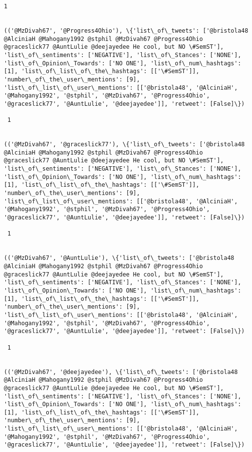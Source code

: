 \documentclass[11pt]{article}
\begin{document}
\begin{Verbatim}[commandchars=\\\{\}]
 1
 

(('@MzDivah67', '@Progress4Ohio'), \{'list\_of\_tweets': ['@bristola48 @AlciniaH @Mahogany1992 @stphil @MzDivah67 @Progress4Ohio @graceslick77 @AuntLulie @deejayedee He cool, but NO \#SemST'], 'list\_of\_sentiments': ['NEGATIVE'], 'list\_of\_Stances': ['NONE'], 'list\_of\_Opinion\_Towards': ['NO ONE'], 'list\_of\_num\_hashtags': [1], 'list\_of\_list\_of\_the\_hashtags': [['\#SemST']], 'number\_of\_the\_user\_mentions': [9], 'list\_of\_list\_of\_user\_mentions': [['@bristola48', '@AlciniaH', '@Mahogany1992', '@stphil', '@MzDivah67', '@Progress4Ohio', '@graceslick77', '@AuntLulie', '@deejayedee']], 'retweet': [False]\})

 1
 

(('@MzDivah67', '@graceslick77'), \{'list\_of\_tweets': ['@bristola48 @AlciniaH @Mahogany1992 @stphil @MzDivah67 @Progress4Ohio @graceslick77 @AuntLulie @deejayedee He cool, but NO \#SemST'], 'list\_of\_sentiments': ['NEGATIVE'], 'list\_of\_Stances': ['NONE'], 'list\_of\_Opinion\_Towards': ['NO ONE'], 'list\_of\_num\_hashtags': [1], 'list\_of\_list\_of\_the\_hashtags': [['\#SemST']], 'number\_of\_the\_user\_mentions': [9], 'list\_of\_list\_of\_user\_mentions': [['@bristola48', '@AlciniaH', '@Mahogany1992', '@stphil', '@MzDivah67', '@Progress4Ohio', '@graceslick77', '@AuntLulie', '@deejayedee']], 'retweet': [False]\})

 1
 

(('@MzDivah67', '@AuntLulie'), \{'list\_of\_tweets': ['@bristola48 @AlciniaH @Mahogany1992 @stphil @MzDivah67 @Progress4Ohio @graceslick77 @AuntLulie @deejayedee He cool, but NO \#SemST'], 'list\_of\_sentiments': ['NEGATIVE'], 'list\_of\_Stances': ['NONE'], 'list\_of\_Opinion\_Towards': ['NO ONE'], 'list\_of\_num\_hashtags': [1], 'list\_of\_list\_of\_the\_hashtags': [['\#SemST']], 'number\_of\_the\_user\_mentions': [9], 'list\_of\_list\_of\_user\_mentions': [['@bristola48', '@AlciniaH', '@Mahogany1992', '@stphil', '@MzDivah67', '@Progress4Ohio', '@graceslick77', '@AuntLulie', '@deejayedee']], 'retweet': [False]\})

 1
 

(('@MzDivah67', '@deejayedee'), \{'list\_of\_tweets': ['@bristola48 @AlciniaH @Mahogany1992 @stphil @MzDivah67 @Progress4Ohio @graceslick77 @AuntLulie @deejayedee He cool, but NO \#SemST'], 'list\_of\_sentiments': ['NEGATIVE'], 'list\_of\_Stances': ['NONE'], 'list\_of\_Opinion\_Towards': ['NO ONE'], 'list\_of\_num\_hashtags': [1], 'list\_of\_list\_of\_the\_hashtags': [['\#SemST']], 'number\_of\_the\_user\_mentions': [9], 'list\_of\_list\_of\_user\_mentions': [['@bristola48', '@AlciniaH', '@Mahogany1992', '@stphil', '@MzDivah67', '@Progress4Ohio', '@graceslick77', '@AuntLulie', '@deejayedee']], 'retweet': [False]\})


\end{Verbatim}
\end{document}
